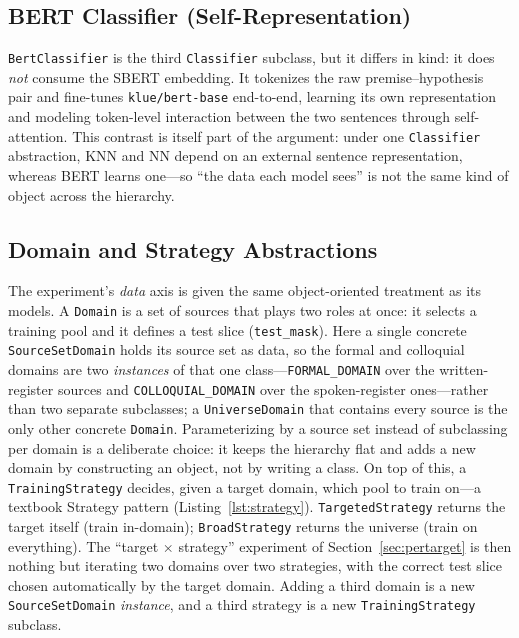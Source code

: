 \documentclass[conference]{IEEEtran}
\begin{document}
\subsection{BERT Classifier (Self-Representation)}
\texttt{BertClassifier} is the third \texttt{Classifier} subclass, but it
differs in kind: it does \emph{not} consume the SBERT embedding. It
tokenizes the raw premise--hypothesis pair and fine-tunes
\texttt{klue/bert-base} end-to-end, learning its own representation and
modeling token-level interaction between the two sentences through
self-attention. This contrast is itself part of the argument: under one
\texttt{Classifier} abstraction, KNN and NN depend on an external
sentence representation, whereas BERT learns one---so ``the data each
model sees'' is not the same kind of object across the hierarchy.

\subsection{Domain and Strategy Abstractions}
\label{sec:domains}
The experiment's \emph{data} axis is given the same object-oriented
treatment as its models. A \texttt{Domain} is a set of sources that plays
two roles at once: it selects a training pool and it defines a test slice
(\texttt{test\_mask}). Here a single concrete \texttt{SourceSetDomain}
holds its source set as data, so the formal and colloquial domains are
two \emph{instances} of that one class---\texttt{FORMAL\_DOMAIN} over
the written-register sources and \texttt{COLLOQUIAL\_DOMAIN} over the
spoken-register ones---rather than two separate subclasses; a
\texttt{UniverseDomain} that contains every source is the only other
concrete \texttt{Domain}. Parameterizing by a source set instead of
subclassing per domain is a deliberate choice: it keeps the hierarchy
flat and adds a new domain by constructing an object, not by writing a
class. On
top of this, a \texttt{TrainingStrategy} decides, given a target domain,
which pool to train on---a textbook Strategy pattern (Listing~\ref{lst:strategy}).
\texttt{TargetedStrategy} returns the target itself (train in-domain);
\texttt{BroadStrategy} returns the universe (train on everything). The
``target $\times$ strategy'' experiment of Section~\ref{sec:pertarget} is
then nothing but iterating two domains over two strategies, with the
correct test slice chosen automatically by the target domain. Adding a
third domain is a new \texttt{SourceSetDomain} \emph{instance}, and a
third strategy is a new \texttt{TrainingStrategy} subclass.
\end{document}
